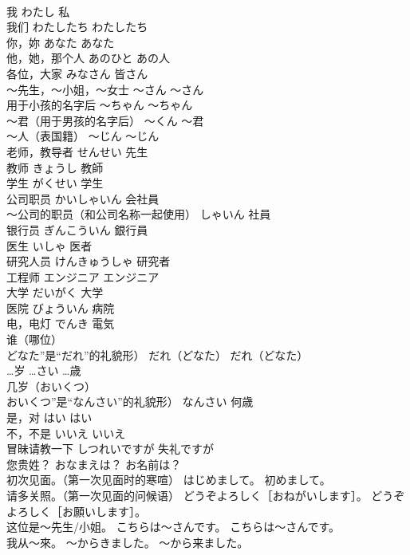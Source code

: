 \documentclass[8pt]{extreport}
\begin{document}
\begin{CJK}{UTF8}{min}
\\	我	わたし	私
\\	我们	わたしたち	わたしたち
\\	你，妳	あなた	あなた
\\	他，她，那个人	あのひと	あの人
\\	各位，大家	みなさん	皆さん
\\	～先生，～小姐，～女士	～さん	～さん
\\	用于小孩的名字后	～ちゃん	～ちゃん
\\	～君（用于男孩的名字后）	～くん	～君
\\	～人（表国籍）	～じん	～じん
\\	老师，教导者	せんせい	先生
\\	教师	きょうし	教師
\\	学生	がくせい	学生
\\	公司职员	かいしゃいん	会社員
\\	～公司的职员（和公司名称一起使用）	しゃいん	社員
\\	银行员	ぎんこういん	銀行員
\\	医生	いしゃ	医者
\\	研究人员	けんきゅうしゃ	研究者
\\	工程师	エンジニア	エンジニア
\\	大学	だいがく	大学
\\	医院	びょういん	病院
\\	电，电灯	でんき	電気
\\	谁（哪位）
\\	どなた”是“だれ”的礼貌形）	だれ（どなた）	だれ（どなた）
\\	…岁	…さい	…歳
\\	几岁（おいくつ）
\\	おいくつ”是“なんさい”的礼貌形）	なんさい	何歳
\\	是，对	はい	はい
\\	不，不是	いいえ	いいえ
\\	冒昧请教一下	しつれいですが	失礼ですが
\\	您贵姓？	おなまえは？	お名前は？
\\	初次见面。（第一次见面时的寒喧）	はじめまして。	初めまして。
\\	请多关照。（第一次见面的问候语）	どうぞよろしく［おねがいします］。	どうぞよろしく［お願いします］。
\\	这位是～先生/小姐。	こちらは～さんです。	こちらは～さんです。
\\	我从～來。	～からきました。	～から来ました。

\end{CJK}
\end{document}
